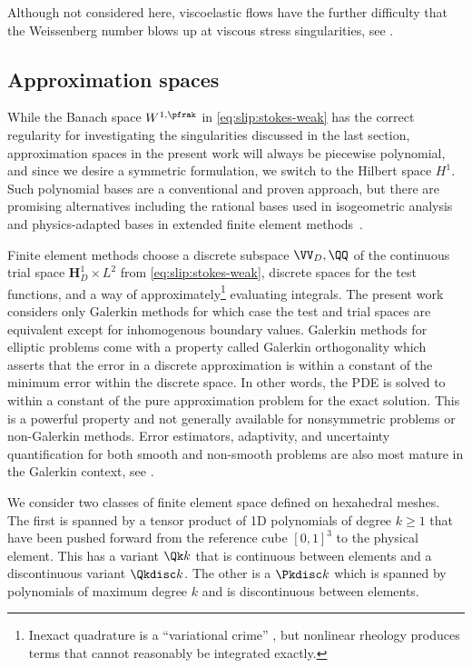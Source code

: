 Although not considered here, viscoelastic flows have the further difficulty that the Weissenberg number blows up at viscous stress singularities, see \citet{lipscomb1987implications,davies1988reentrant,hinch1993flow,owens2002cr}.

\subsection{Approximation spaces}\label{sssec:approximation}
While the Banach space $W^{1,\pfrak}$ in \eqref{eq:slip:stokes-weak} has the correct regularity for investigating the singularities discussed in the last section, approximation spaces in the present work will always be piecewise polynomial, and since we desire a symmetric formulation, we switch to the Hilbert space $H^1$.
Such polynomial bases are a conventional and proven approach, but there are promising alternatives including the rational bases used in isogeometric analysis~\citep{hughes2005isogeometric,cottrell2009isogeometric} and physics-adapted bases in extended finite element methods~\citep{belytschko2009review,mohammadi2008extended}.

Finite element methods choose a discrete subspace $\VV_D,\QQ$ of the continuous trial space $\bm H_D^1 \times L^2$ from \eqref{eq:slip:stokes-weak}, discrete spaces for the test functions, and a way of approximately\footnote{Inexact quadrature is a ``variational crime'' \citep{brenner2008mathematical}, but nonlinear rheology produces terms that cannot reasonably be integrated exactly.} evaluating integrals.
The present work considers only Galerkin methods for which case the test and trial spaces are equivalent except for inhomogenous boundary values.
Galerkin methods for elliptic problems come with a property called Galerkin orthogonality which asserts that the error in a discrete approximation is within a constant of the minimum error within the discrete space.
In other words, the PDE is solved to within a constant of the pure approximation problem for the exact solution.
This is a powerful property and not generally available for nonsymmetric problems or non-Galerkin methods.
Error estimators, adaptivity, and uncertainty quantification for both smooth and non-smooth problems are also most mature in the Galerkin context, see \citet{ainsworth1997pee,matthies2005gml,babuska2005scm,barth2010mlmcfe}.

We consider two classes of finite element space defined on hexahedral meshes.
The first is spanned by a tensor product of 1D polynomials of degree $k \ge 1$ that have been pushed forward from the reference cube $[0,1]^3$ to the physical element.
This has a variant $\Qk k$ that is continuous between elements and a discontinuous variant $\Qkdisc k$.
The other is a $\Pkdisc k$ which is spanned by polynomials of maximum degree $k$ and is discontinuous between elements.

